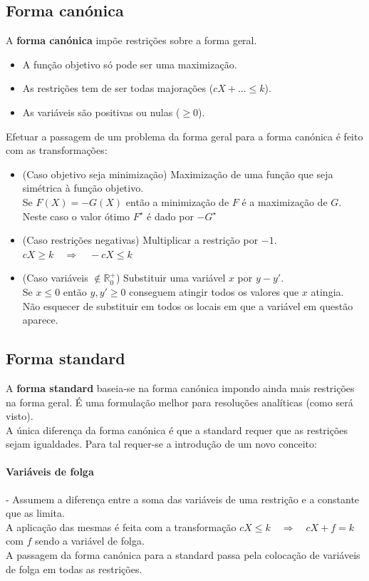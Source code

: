 \documentclass[]{report}
\begin{document}
\subsection{Forma canónica}
A \textbf{forma canónica} impõe restrições sobre a forma geral.
\begin{itemize}
\item A função objetivo só pode ser uma maximização.
\item As restrições tem de ser todas majorações ($cX + \dots  \leq k$).
\item As variáveis são positivas ou nulas ($\geq 0$).
\end{itemize}
Efetuar a passagem de um problema da forma geral para a forma canónica é feito com as transformações:
\begin{itemize}
\item (Caso objetivo seja minimização) Maximização de uma função que seja simétrica à função objetivo.\\
Se $F(X)=-G(X)$ então a minimização de $F$ é a maximização de $G$.\\
Neste caso o valor ótimo $F^\star$ é dado por $-G^\star$
\item (Caso restrições negativas) Multiplicar a restrição por $-1$.\\
$cX \geq k \quad \Rightarrow \quad -cX \leq k$
\item (Caso variáveis $\notin \mathbb{R}^+_0$) Substituir uma variável $x$ por $y-y'$.\\
Se $x \leq 0$ então $y,y' \geq 0$ conseguem atingir todos os valores que $x$ atingia.\\
Não esquecer de substituir em todos os locais em que a variável em questão aparece.
\end{itemize}
\subsection{Forma standard}
A \textbf{forma standard} baseia-se na forma canónica impondo ainda mais restrições na forma geral. É uma formulação melhor para resoluções analíticas (como será visto).\\[0.5cm]
A única diferença da forma canónica é que a standard requer que as restrições sejam igualdades. Para tal requer-se a introdução de um novo conceito:
\paragraph{Variáveis de folga} - Assumem a diferença entre a soma das variáveis de uma restrição e a constante que as limita.\\
A aplicação das mesmas é feita com a transformação $cX \leq k \quad \Rightarrow \quad cX + f = k$ com $f$ sendo a variável de folga.\\[0.5cm]
\noindent A passagem da forma canónica para a standard passa pela colocação de variáveis de folga em todas as restrições.
\end{document}
